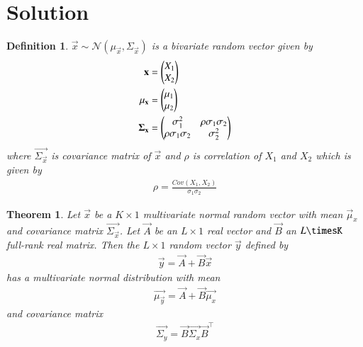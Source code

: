 \documentclass[journal,12pt,twocolumn]{IEEEtran}
\newtheorem{theorem}{Theorem}[section]
\newtheorem{definition}{Definition}[section]
\begin{document}
\section*{Solution}
\begin{definition}
    $\vec{x}\sim\mathcal{N}(\mu_{\vec{x}},\Sigma_{\vec{x}})$ is a bivariate random vector given by
    \begin{align}
        \mathbf{x}&=\begin{pmatrix}X_1\\
                       X_2\end{pmatrix}\\
        \mathbf{\mu_{\mathbf{x}}}&=\begin{pmatrix}\mu_1\\
                                    \mu_2\end{pmatrix}\\
        \mathbf{\Sigma_{\mathbf{x}}}&=\begin{pmatrix}\sigma_1^2&\rho\sigma_1\sigma_2\\
                                        \rho\sigma_1\sigma_2&\sigma_2^2\end{pmatrix}
    \end{align}
    where $\vec{\Sigma_{\vec{x}}}$ is covariance matrix of $\vec{x}$ and $\rho$ is correlation of $X_1$ and $X_2$ which is given by
    \begin{align}
        \rho=\frac{Cov(X_1,X_2)}{\sigma_1\sigma_2}
    \end{align}
\end{definition}
\begin{theorem}
     Let $\vec{x}$ be a $K\times1$ multivariate normal random vector with mean $\vec{\mu}_x$ and covariance matrix $\vec{\Sigma_{\vec{x}}}$. Let $\vec{A}$ be an $L\times1$ real vector and $\vec{B}$ an $L\timesK$ full-rank real matrix. Then the $L\times1$ random vector $\vec{y}$ defined by
     \begin{align}
         \vec{y}=\vec{A}+\vec{B}\vec{x}
     \end{align}
     has a multivariate normal distribution with mean
     \begin{align}
         \vec{\mu_\vec{y}}=\vec{A}+\vec{B}\vec{\mu_x}
     \end{align}
     and covariance matrix
     \begin{align}
         \vec{\Sigma_y}=\vec{B}\vec{\Sigma_x}\vec{B}^{\top}
     \end{align}
\end{theorem}
\end{document}
